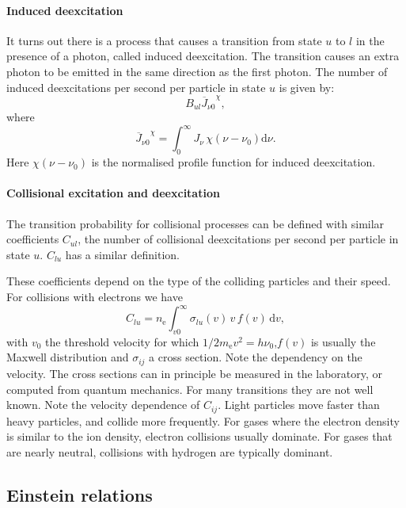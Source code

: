 \documentclass[12pt]{article}
\numberwithin{equation}{section}
\def\dd{\mathrm{d}}
\def\Jnu{\ensuremath{J_{\nu}}}
\def\nelec{\ensuremath{n_\mathrm{e}}}
\def\Jbar{\ensuremath{\overline{J}_{\nu0}}}
\newcommand{\be}{\begin{equation}}
\newcommand{\ee}{\end{equation}}
\begin{document}
\paragraph{Induced deexcitation}
It turns out there is a process that causes a transition from state $u$ to $l$ in the presence of a photon, called induced deexcitation. The transition causes an extra photon to be emitted in the same direction as the first photon. The number of induced deexcitations per second per particle in state $u$ is given by:
\be
B_{ul} \Jbar^\chi,
\ee
where 
\be
 \Jbar^\chi = \int_0^\infty \Jnu \, \chi (\nu-\nu_0) \dd \nu.
\ee
Here $\chi(\nu-\nu_0)$ is the normalised profile function for induced deexcitation.

\paragraph{Collisional excitation and deexcitation}

The transition probability for collisional processes can be defined with similar coefficients $C_{ul}$, the number of collisional deexcitations per second per particle in state $u$. $C_{lu}$ has a similar definition.

These coefficients depend on the type of the colliding particles and their speed. For collisions with electrons we have
\be
C_{lu} = \nelec \int_{v0}^\infty \sigma_{lu}(v) \, v \, f(v) \, \dd v,
\ee 
with $v_0$ the threshold velocity for which $1/2 m_\mathrm{e} v^2 = h\nu_0$,$f(v)$ is usually the Maxwell distribution and $\sigma_{ij}$ a cross section. Note the dependency on the velocity. The cross sections can  in principle be measured in the laboratory, or computed from quantum mechanics. For many transitions they are not well known.  Note the velocity dependence of $C_{ij}$. Light particles move faster than heavy particles, and collide more frequently. For gases where the electron density is similar to the ion density, electron collisions usually dominate. For gases that are nearly neutral, collisions with hydrogen are typically dominant.

\subsection{Einstein relations}
\end{document}
